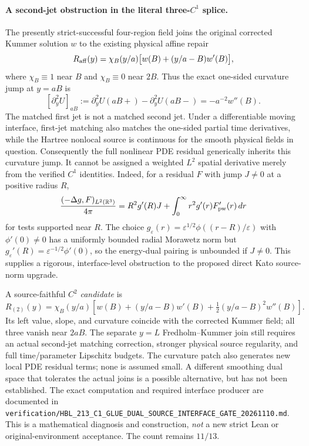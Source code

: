 \documentclass[11pt]{amsart}
\begin{document}
\paragraph{A second-jet obstruction in the literal three-\(C^1\) splice.}
The presently strict-successful four-region field joins the original
corrected Kummer solution \(w\) to the existing physical affine
repair
\[
 R_{\rm aff}(y)=\chi_B(y/a)\bigl[w(B)+(y/a-B)w'(B)\bigr],
\]
where \(\chi_B\equiv1\) near \(B\) and \(\chi_B\equiv0\)
near \(2B\). Thus the exact one-sided curvature jump at
\(y=aB\) is
\[
 [\partial_y^2U]_{aB}
 :=\partial_y^2U(aB+)-\partial_y^2U(aB-)
 =-a^{-2}w''(B).
\]
The matched first jet is not a matched second jet. Under a
differentiable moving interface, first-jet matching also
matches the one-sided partial time derivatives, while the
Hartree nonlocal source is continuous for the smooth
physical fields in question. Consequently the full
nonlinear PDE residual generically inherits this curvature
jump. It cannot be assigned a weighted \(L^2\) spatial
derivative merely from the verified \(C^1\) identities.
Indeed, for a residual \(F\) with jump \(J\ne0\) at
a positive radius \(R\),
\[
 \frac{(-\Delta g,F)_{L^2(\mathbb R^3)}}{4\pi}
 =R^2g'(R)J+\int_0^\infty r^2g'(r)F'_{\rm pw}(r)\,dr
\]
for tests supported near \(R\). The choice
\(g_\varepsilon(r)=\varepsilon^{1/2}
\phi((r-R)/\varepsilon)\) with \(\phi'(0)\ne0\)
has a uniformly bounded radial Morawetz norm but
\(g_\varepsilon'(R)=\varepsilon^{-1/2}\phi'(0)\),
so the energy-dual pairing is unbounded if \(J\ne0\).
This supplies a rigorous, interface-level obstruction
to the proposed direct Kato source-norm upgrade.

A source-faithful \(C^2\) \emph{candidate} is
\[
 R_{(2)}(y)=\chi_B(y/a)
 \left[w(B)+(y/a-B)w'(B)
        +\tfrac12(y/a-B)^2w''(B)\right].
\]
Its left value, slope, and curvature coincide with
the corrected Kummer field; all three vanish near
\(2aB\). The separate \(y=L\) Fredholm--Kummer
join still requires an actual second-jet matching
correction, stronger physical source regularity, and
full time/parameter Lipschitz budgets. The curvature
patch also generates new local PDE residual terms;
none is assumed small. A different smoothing dual
space that tolerates the actual joins is a possible
alternative, but has not been established.
The exact computation and required interface producer
are documented in
\texttt{verification/HBL\_213\_C1\_GLUE\_DUAL\_SOURCE\_INTERFACE\_GATE\_20261110.md}.
This is a mathematical diagnosis and construction,
\emph{not} a new strict Lean or original-environment
acceptance. The count remains \(11/13\).
\end{document}
